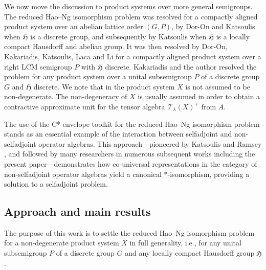\documentclass[11pt,final]{amsart}
\numberwithin{equation}{section}
\theoremstyle{plain}
\theoremstyle{definition}
\theoremstyle{remark}
\newcommand{\T}{{\mathcal{T}}}
\def\la{\lambda}
\newcommand{\fH}{{\mathfrak{H}}}
\begin{document}
We now move the discussion to product systems over more general semigroups. The reduced Hao--Ng isomorphism problem was resolved for a compactly aligned product system over an abelian lattice order $(G,P)$, by Dor-On and Katsoulis \cite{DK20} when $\fH$ is a discrete group, and subsequently by Katsoulis \cite{Kat20} when $\fH$ is a locally compact Hausdorff and abelian group.
It was then resolved by Dor-On, Kakariadis, Katsoulis, Laca and Li \cite{DKKLL22} for a compactly aligned product system over a right LCM semigroup $P$ with $\fH$ discrete. Kakariadis and the author \cite{KP25} resolved the problem for any product system over a unital subsemigroup $P$ of a discrete group $G$ and $\fH$ discrete. We note that in \cite{KP25} the product system $X$ is not assumed to be non-degenerate. The non-degeneracy of $X$ is usually assumed in order to obtain a contractive approximate unit for the tensor algebra $\T_\la(X)^+$ from $A$.

The use of the C*-envelope toolkit for the reduced Hao–Ng isomorphism problem stands as an essential example of the interaction between selfadjoint and non-selfadjoint operator algebras. This approach---pioneered by Katsoulis and Ramsey \cite{KR19}, and followed by many researchers in numerous subsequent works \cite{DKKLL22, DK20, KP25, Kat17, Kat20, KR21} including the present paper—demonstrates how co-universal representations in the
category of non-selfadjoint operator algebras yield a canonical $*$-isomorphism, providing a solution to a selfadjoint problem.

\subsection{Approach and main results}

The purpose of this work is to settle the reduced Hao--Ng isomorphism problem for a non-degenerate product system $X$ in full generality, i.e., for any unital subsemigroup $P$ of a discrete group $G$ and any locally compact Hausdorff group $\fH$.
\end{document}
